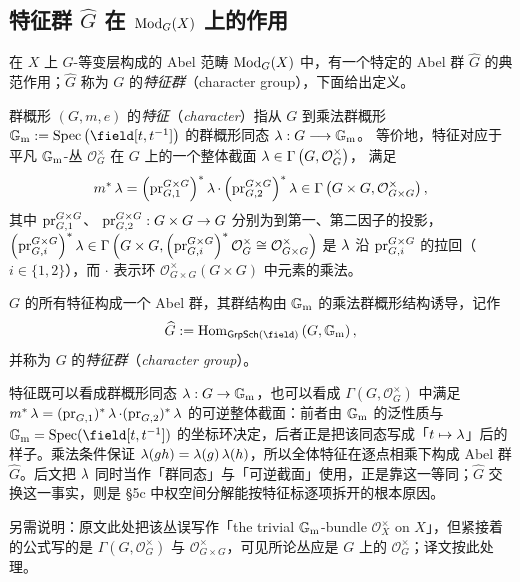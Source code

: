 \subsection{特征群 $\widehat{G}$ 在 $\operatorname{\mathrm{Mod}}_G(X)$ 上的作用}

在 $X$ 上 $G$-等变层构成的 Abel 范畴 $\operatorname{\mathrm{Mod}}_G(X)$ 中，有一个特定的 Abel 群 $\widehat{G}$ 的典范作用；$\widehat{G}$ 称为 $G$ 的\emph{特征群}（character group），下面给出定义。

\begin{defn}
群概形 $(G,m,e)$ 的\emph{特征}（\emph{character}）指从 $G$ 到乘法群概形
$
\Gm := \Spec\left(\field[t, t^{-1}]\right)
$
的群概形同态
$
\operatorname{\lambda} : G \longrightarrow \operatorname{\mathbb{G}_{\operatorname{m}}}
$。
等价地，特征对应于平凡 $\operatorname{\mathbb{G}_{\operatorname{m}}}$-丛 $\mathcal{O}_G^\times$ 在 $G$ 上的一个整体截面
$
\operatorname{\lambda}
\in
\Gamma\left(G, \mathcal{O}_G^\times\right)
$，
满足
$$
m^* \operatorname{\lambda}
=
\left(\operatorname{\operatorname{pr}}_{G,1}^{G \times G}\right)^* \operatorname{\lambda}
\cdot
\left(\operatorname{\operatorname{pr}}_{G,2}^{G \times G}\right)^* \operatorname{\lambda}
\in
\Gamma\left(G \times G, \mathcal{O}_{G \times G}^\times\right),
$$
其中
$\operatorname{\operatorname{pr}}_{G,1}^{G \times G}$、
$\operatorname{\operatorname{pr}}_{G,2}^{G \times G}
:
G \times G \rightarrow G
$
分别为到第一、第二因子的投影，
$
\left(\operatorname{\operatorname{pr}}_{G,i}^{G \times G}\right)^* \operatorname{\lambda}
\in
\Gamma\left(
G \times G,
\left(\operatorname{\operatorname{pr}}_{G,i}^{G \times G}\right)^*\mathcal{O}_G^\times
\cong
\mathcal{O}_{G \times G}^\times
\right)
$
是 $\operatorname{\lambda}$ 沿 $\operatorname{\operatorname{pr}}_{G,i}^{G\times G}$ 的拉回（$i\in\{1,2\}$），而 $\cdot$ 表示环
$\mathcal{O}_{G\times G}^\times(G\times G)$ 中元素的乘法。

$G$ 的所有特征构成一个 Abel 群，其群结构由 $\operatorname{\mathbb{G}_{\operatorname{m}}}$ 的乘法群概形结构诱导，记作
$$
\widehat{G}
:=
\operatorname{Hom}_{\mathsf{GrpSch}(\field)}\left(G, \Gm\right),
$$
并称为 $G$ 的\emph{特征群}（\emph{character group}）。
\end{defn}

\begin{yizhu}[「特征」的两种等价说法]
特征既可以看成群概形同态 $\operatorname{\lambda}:G\rightarrow\operatorname{\mathbb{G}_{\operatorname{m}}}$，也可以看成 $\Gamma(G,\mathcal{O}_G^\times)$ 中满足 $m^*\operatorname{\lambda}=(\operatorname{\operatorname{pr}}_{G,1})^*\operatorname{\lambda}\cdot(\operatorname{\operatorname{pr}}_{G,2})^*\operatorname{\lambda}$ 的可逆整体截面：前者由 $\operatorname{\mathbb{G}_{\operatorname{m}}}$ 的泛性质与 $\Gm=\Spec(\field[t,t^{-1}])$ 的坐标环决定，后者正是把该同态写成「$t\mapsto\operatorname{\lambda}$」后的样子。乘法条件保证 $\operatorname{\lambda}(gh)=\operatorname{\lambda}(g)\operatorname{\lambda}(h)$，所以全体特征在逐点相乘下构成 Abel 群 $\widehat{G}$。后文把 $\operatorname{\lambda}$ 同时当作「群同态」与「可逆截面」使用，正是靠这一等同；$\widehat{G}$ 交换这一事实，则是 §5c 中权空间分解能按特征标逐项拆开的根本原因。

另需说明：原文此处把该丛误写作「the trivial $\operatorname{\mathbb{G}_{\operatorname{m}}}$-bundle $\mathcal{O}_X^\times$ on $X$」，但紧接着的公式写的是 $\Gamma(G,\mathcal{O}_G^\times)$ 与 $\mathcal{O}_{G\times G}^\times$，可见所论丛应是 $G$ 上的 $\mathcal{O}_G^\times$；译文按此处理。
\end{yizhu}

